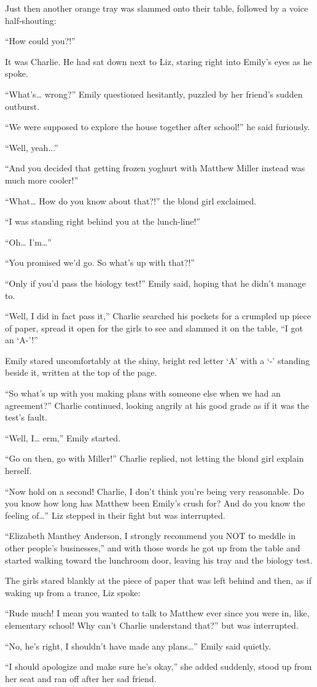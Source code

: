 Just then another orange tray was slammed onto their table, followed by a voice half-shouting:

“How could you?!”

It was Charlie. He had sat down next to Liz, staring right into Emily’s eyes as he spoke.

“What’s… wrong?” Emily questioned hesitantly, puzzled by her friend’s sudden outburst.

“We were supposed to explore the house together after school!” he said furiously.

“Well, yeah...”

“And you decided that getting frozen yoghurt with Matthew Miller instead was much more cooler!”

“What… How do you know about that?!” the blond girl exclaimed.

“I was standing right behind you at the lunch-line!”

“Oh… I’m…”

“You promised we’d go. So what’s up with that?!”

“Only if you’d pass the biology test!” Emily said, hoping that he didn’t manage to.

“Well, I did in fact pass it,” Charlie searched his pockets for a crumpled up piece of paper, spread it open for the girls to see and slammed it on the table, “I got an ‘A-’!”

Emily stared uncomfortably at the shiny, bright red letter ‘A’ with a ‘-’ standing beside it, written at the top of the page.

“So what’s up with you making plans with someone else when we had an agreement?” Charlie continued, looking angrily at his good grade as if it was the test’s fault.

“Well, I… erm,” Emily started.

“Go on then, go with Miller!” Charlie replied, not letting the blond girl explain herself.

“Now hold on a second! Charlie, I don’t think you’re being very reasonable. Do you know how long has Matthew been Emily’s crush for? And do you know the feeling of…” Liz stepped in their fight but was interrupted.

“Elizabeth Manthey Anderson, I strongly recommend you NOT to meddle in other people’s businesses,” and with those words he got up from the table and started walking toward the lunchroom door, leaving his tray and the biology test.

The girls stared blankly at the piece of paper that was left behind and then, as if waking up from a trance, Liz spoke:

“Rude much! I mean you wanted to talk to Matthew ever since you were in, like,  elementary school! Why can’t Charlie understand that?” but was interrupted.

“No, he’s right, I shouldn’t have made any plans…” Emily said quietly.

“I should apologize and make sure he’s okay,” she added suddenly, stood up from her seat and ran off after her sad friend.